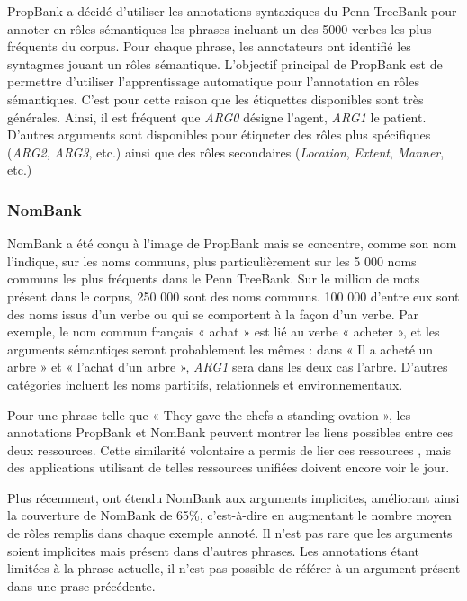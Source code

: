 PropBank \citep{palmer2005proposition} a décidé d'utiliser les annotations syntaxiques du Penn TreeBank \citep{marcus1993building} pour annoter en rôles sémantiques les phrases incluant un des 5000 verbes les plus fréquents du corpus. Pour chaque phrase, les annotateurs ont identifié les syntagmes jouant un rôles sémantique. L'objectif principal de PropBank est de permettre d'utiliser l'apprentissage automatique pour l'annotation en rôles sémantiques. C'est pour cette raison que les étiquettes disponibles sont très générales. Ainsi, il est fréquent que \textit{ARG0} désigne l'agent, \textit{ARG1} le patient. D'autres arguments sont disponibles pour étiqueter des rôles plus spécifiques (\textit{ARG2}, \textit{ARG3}, etc.) ainsi que des rôles secondaires (\textit{Location}, \textit{Extent}, \textit{Manner}, etc.)

\subsubsection{NomBank}

NomBank \citep{meyers2004nombank} a été conçu à l'image de PropBank mais se concentre, comme son nom l'indique, sur les noms communs, plus particulièrement sur les 5 000 noms communs les plus fréquents dans le Penn TreeBank. Sur le million de mots présent dans le corpus, 250 000 sont des noms communs. 100 000 d'entre eux sont des noms issus d'un verbe ou qui se comportent à la façon d'un verbe. Par exemple, le nom commun français « achat » est lié au verbe « acheter », et les arguments sémantiqes seront probablement les mêmes : dans « Il a acheté un arbre » et « l'achat d'un arbre », \textit{ARG1} sera dans les deux cas l'arbre. D'autres catégories incluent les noms partitifs, relationnels et environnementaux.

Pour une phrase telle que « They gave the chefs a standing ovation », les annotations PropBank et NomBank peuvent montrer les liens possibles entre ces deux ressources. Cette similarité volontaire a permis de lier ces ressources \citep{pustejovsky2005merging,verhagen2007combining}, mais des applications utilisant de telles ressources unifiées doivent encore voir le jour.

Plus récemment, \cite{gerber2010beyond} ont étendu NomBank aux arguments implicites, améliorant ainsi la couverture de NomBank de 65\%, c'est-à-dire en augmentant le nombre moyen de rôles remplis dans chaque exemple annoté. Il n'est pas rare que les arguments soient implicites mais présent dans d'autres phrases. Les annotations étant limitées à la phrase actuelle, il n'est pas possible de référer à un argument présent dans une prase précédente.

